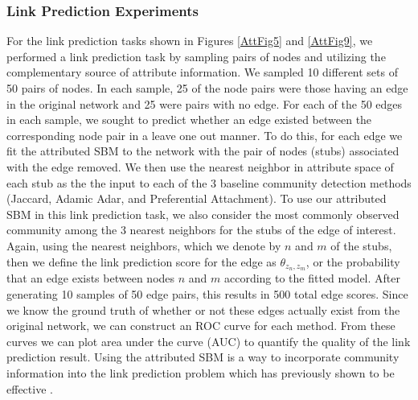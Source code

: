 \subsubsection{Link Prediction Experiments}
For the link prediction tasks shown in Figures \ref{AttFig5} and \ref{AttFig9}, we performed a link prediction task by sampling pairs of nodes and utilizing the complementary source of attribute information. We sampled 10 different sets of 50 pairs of nodes. In each sample, 25 of the node pairs were those having an edge in the original network and 25 were pairs with no edge. For each of the 50 edges in each sample, we sought to predict whether an edge existed between the corresponding node pair in a leave one out manner. To do this, for each edge we fit the attributed SBM to the network with the pair of nodes (stubs) associated with the edge removed. We then use the nearest neighbor in attribute space of each stub as the the input to each of the 3 baseline community detection methods (Jaccard, Adamic Adar, and Preferential Attachment). To use our attributed SBM in this link prediction task, we also consider the most commonly observed community among the 3 nearest neighbors for the stubs of the edge of interest. Again, using the nearest neighbors, which we denote by $n$ and $m$ of the stubs, then we define the link prediction score for the edge as $\theta_{z_{n},z_{m}}$, or the probability that an edge exists between nodes $n$ and $m$ according to the fitted model. After generating 10 samples of 50 edge pairs, this results in 500 total edge scores. Since we know the ground truth of whether or not these edges actually exist from the original network, we can construct an ROC curve for each method. From these curves we can plot area under the curve (AUC) to quantify the quality of the link prediction result. Using the attributed SBM is a way to incorporate community information into the link prediction problem which has previously shown to be effective \cite{linkComm}.

